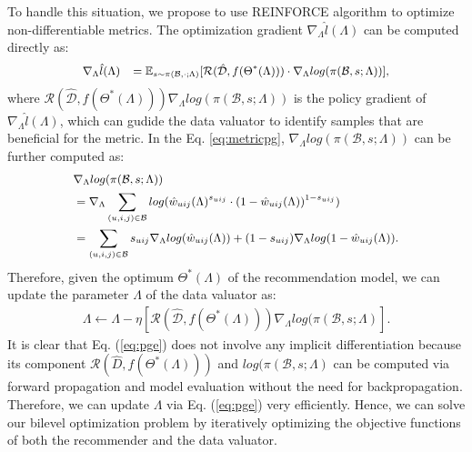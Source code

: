 To handle this situation, we propose to use REINFORCE algorithm to optimize non-differentiable metrics. The optimization gradient $\nabla_{\Lambda}\hat{l}(\Lambda)$ can be computed directly as:
\begin{equation}
    \label{eq:metricpg}
    \small
    \begin{aligned}
        &\nabla_{\Lambda}\hat{l}(\Lambda)
        &=\mathbb{E}_{s\sim \pi(\mathcal{B},\cdot;{\Lambda})}[\mathcal{R}(\hat{\mathcal{D}}, f(\Theta^*(\Lambda)))\cdot \nabla_{\Lambda}log(\pi(\mathcal{B},s;{\Lambda}))],
    \end{aligned}
\end{equation}
where $\mathcal{R}(\hat{\mathcal{D}}, f(\Theta^*(\Lambda)))\nabla_{\Lambda}log(\pi(\mathcal{B},s;{\Lambda}))$ is the policy gradient of $ \nabla_{\Lambda}\hat{l}(\Lambda)$, which can gudide the data valuator to identify samples that are beneficial for the metric. In the Eq. \ref{eq:metricpg}, $\nabla_{\Lambda}log(\pi(\mathcal{B},s;{\Lambda}))$ can be further computed as:
\begin{equation}
    \small
    \begin{aligned}
    \label{eq:lambda}
        &\nabla_{\Lambda}log(\pi(\mathcal{B},s;{\Lambda}))
        \\&=\nabla_{\Lambda}\sum_{(u,i,j)\in \mathcal{B}} log(\hat{w}_{uij}(\Lambda)^{s_{uij}}\cdot(1-\hat{w}_{uij}(\Lambda))^{1-s_{uij}})
        \\&=\sum_{(u,i,j)\in \mathcal{B}} s_{uij}\nabla_{\Lambda}log(\hat{w}_{uij}(\Lambda))+(1-s_{uij})\nabla_{\Lambda}log(1-\hat{w}_{uij}(\Lambda)).
    \end{aligned}
\end{equation}
Therefore, given the optimum $\Theta^{*}(\Lambda)$ of the recommendation model, we can update the parameter $\Lambda$ of the data valuator as:
\begin{equation}
    \begin{aligned}
    \label{eq:pge}
        \Lambda \longleftarrow \Lambda - \eta [\mathcal{R}(\hat{\mathcal{D}}, f(\Theta^*(\Lambda)))\nabla_{\Lambda}log(\pi(\mathcal{B},s;{\Lambda})].
    \end{aligned}
\end{equation}
It is clear that Eq. (\ref{eq:pge}) does not involve any implicit differentiation because its component $\mathcal{R}(\hat{D}, f(\Theta^*(\Lambda)))$ and $log(\pi(\mathcal{B},s;{\Lambda})$ can be computed via forward propagation and model evaluation without the need for backpropagation. Therefore, we can update $\Lambda$ via Eq. (\ref{eq:pge}) very efficiently. 
Hence, we can solve our bilevel optimization problem by iteratively optimizing the objective functions of both the recommender and the data valuator. 